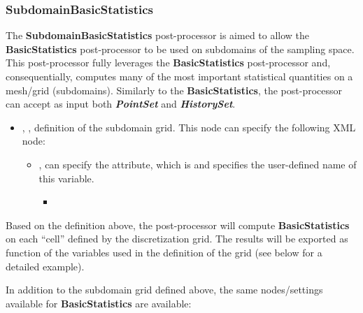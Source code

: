 \subsubsection{SubdomainBasicStatistics}
\label{SubdomainBasicStatistics}
The \textbf{SubdomainBasicStatistics} post-processor is aimed to allow the \textbf{BasicStatistics}
post-processor to be used on subdomains of the sampling space. This post-processor fully leverages
the \textbf{BasicStatistics} post-processor and, consequentially, computes many of the most important statistical quantities on 
a mesh/grid (subdomains). 
Similarly to the \textbf{BasicStatistics}, the post-processor can accept as input both \textit{\textbf{PointSet}} 
and \textit{\textbf{HistorySet}}.


\begin{itemize}
  \item {}, , definition of the subdomain grid. This node
  can specify the following XML node:
  \begin{itemize}
    \item {},  can specify the  attribute, which is  and specifies the user-defined name of this variable.
    \variableChildrenIntro
    \begin{itemize}
     \item \gridDescriptionNoCDF
    \end{itemize}
  \end{itemize}
\end{itemize}

Based on the definition above, the post-processor will compute \textbf{BasicStatistics} on each ``cell'' defined
by the discretization grid. The results will be exported as function of the variables used
in the definition of the grid (see below for a detailed example).

In addition to the subdomain grid defined above, the same nodes/settings available for \textbf{BasicStatistics}
are available:

\basicStatisticsBody

